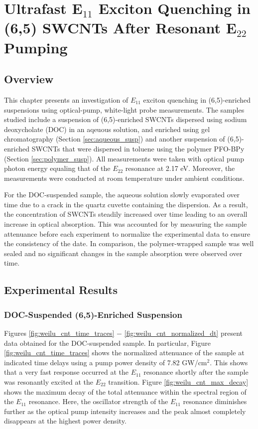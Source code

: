 \chapter{Ultrafast E$_{11}$ Exciton Quenching in (6,5) SWCNTs After Resonant E$_{22}$ Pumping}

\section{Overview}

This chapter presents an investigation of $E_{11}$ exciton quenching in (6,5)-enriched suspensions using optical-pump, white-light probe measurements. The samples studied include a suspension of (6,5)-enriched SWCNTs dispersed using sodium deoxycholate (DOC) in an aqeuous solution, and enriched using gel chromatography (Section \ref{sec:aqueous_susp}) and another suspension of (6,5)-enriched SWCNTs that were dispersed in toluene using the polymer PFO-BPy (Section \ref{sec:polymer_susp}). All measurements were taken with optical pump photon energy equaling that of the $E_{22}$ resonance at 2.17 eV. Moreover, the measurements were conducted at room temperature under ambient conditions.

For the DOC-suspended sample, the aqueous solution slowly evaporated over time due to a crack in the quartz cuvette containing the dispersion. As a result, the concentration of SWCNTs steadily increased over time leading to an overall increase in optical absorption. This was accounted for by measuring the sample attenuance before each experiment to normalize the experimental data to ensure the consistency of the date. In comparison, the polymer-wrapped sample was well sealed and no significant changes in the sample absorption were observed over time.


\section{Experimental Results}

\subsection{DOC-Suspended (6,5)-Enriched Suspension}

Figures \ref{fig:weilu_cnt_time_traces} $-$ \ref{fig:weilu_cnt_normalized_dt} present data obtained for the DOC-suspended sample. In particular, Figure \ref{fig:weilu_cnt_time_traces} shows the normalized attenuance of the sample at indicated time delays using a pump power density of 7.82 GW/cm$^2$. This shows that a very fast response occurred at the $E_{11}$ resonance shortly after the sample was resonantly excited at the $E_{22}$ transition. Figure \ref{fig:weilu_cnt_max_decay} shows the maximum decay of the total attenuance within the spectral region of the $E_{11}$ resonance. Here, the oscillator strength of the $E_{11}$ resonance diminishes further as the optical pump intensity increases and the peak almost completely disappears at the highest power density.

